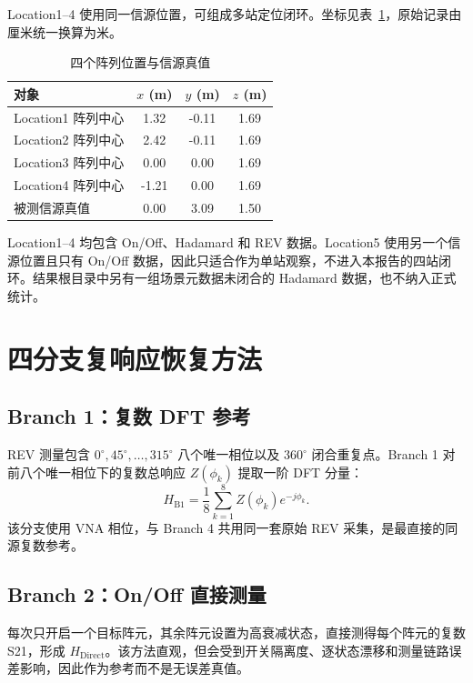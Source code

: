 \documentclass[UTF8,12pt,a4paper]{ctexart}
\begin{document}
Location1--4 使用同一信源位置，可组成多站定位闭环。坐标见表~\ref{tab:geometry}，原始记录由厘米统一换算为米。

\begin{table}[H]
  \centering
  \caption{四个阵列位置与信源真值}
  \label{tab:geometry}
  \begin{tabular}{lccc}
    \toprule
    对象 & $x$ (m) & $y$ (m) & $z$ (m) \\
    \midrule
    Location1 阵列中心 & 1.32 & -0.11 & 1.69 \\
    Location2 阵列中心 & 2.42 & -0.11 & 1.69 \\
    Location3 阵列中心 & 0.00 & 0.00 & 1.69 \\
    Location4 阵列中心 & -1.21 & 0.00 & 1.69 \\
    被测信源真值 & 0.00 & 3.09 & 1.50 \\
    \bottomrule
  \end{tabular}
\end{table}

Location1--4 均包含 On/Off、Hadamard 和 REV 数据。Location5 使用另一个信源位置且只有 On/Off 数据，因此只适合作为单站观察，不进入本报告的四站闭环。结果根目录中另有一组场景元数据未闭合的 Hadamard 数据，也不纳入正式统计。

\section{四分支复响应恢复方法}

\subsection{Branch 1：复数 DFT 参考}

REV 测量包含 $0^\circ,45^\circ,\ldots,315^\circ$ 八个唯一相位以及 $360^\circ$ 闭合重复点。Branch 1 对前八个唯一相位下的复数总响应 $Z(\phi_k)$ 提取一阶 DFT 分量：
\begin{equation}
  H_{\mathrm{B1}}=\frac{1}{8}\sum_{k=1}^{8}Z(\phi_k)e^{-j\phi_k}.
\end{equation}
该分支使用 VNA 相位，与 Branch 4 共用同一套原始 REV 采集，是最直接的同源复数参考。

\subsection{Branch 2：On/Off 直接测量}

每次只开启一个目标阵元，其余阵元设置为高衰减状态，直接测得每个阵元的复数 S21，形成 $H_{\mathrm{Direct}}$。该方法直观，但会受到开关隔离度、逐状态漂移和测量链路误差影响，因此作为参考而不是无误差真值。
\end{document}
